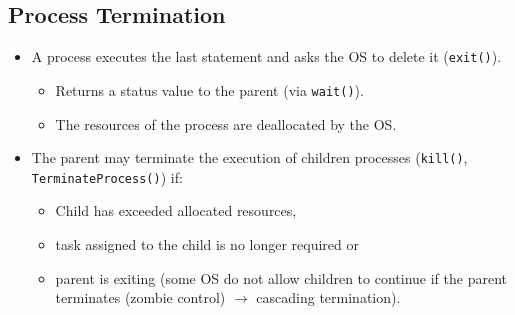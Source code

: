 		\subsection{Process Termination}
			\begin{itemize}
				\item A process executes the last statement and asks the OS to delete it (\texttt{exit()}).
					\begin{itemize}
						\item Returns a status value to the parent (via \texttt{wait()}).
						\item The resources of the process are deallocated by the OS.
					\end{itemize}
				\item The parent may terminate the execution of children processes (\texttt{kill()}, \texttt{TerminateProcess()}) if:
					\begin{itemize}
						\item Child has exceeded allocated resources,
						\item task assigned to the child is no longer required or
						\item parent is exiting (some OS do not allow children to continue if the parent terminates (zombie control) \(\rightarrow\) cascading termination).
					\end{itemize}
			\end{itemize}

